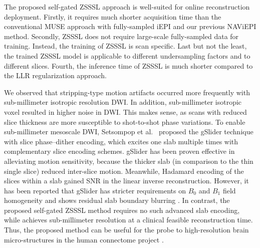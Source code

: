 \documentclass[journal,twoside,web]{ieeecolor}
\begin{document}

	The proposed self-gated ZSSSL approach is well-suited for online reconstruction deployment.
	Firstly, it requires much shorter acquisition time than
	the conventional MUSE approach with fully-sampled iEPI and
	our previous NAViEPI method.
	Secondly, ZSSSL does not require large-scale fully-sampled data for training.
	Instead, the training of ZSSSL is scan specific.
	Last but not the least,
	the trained ZSSSL model is applicable to different undersampling factors
	and to different slices.
	Fourth, the inference time of ZSSSL is much
	shorter compared to the LLR regularization approach.

	We observed that stripping-type motion artifacts occurred more frequently
	with sub-millimeter isotropic resolution DWI.
	In addition, sub-millimeter isotropic voxel resulted in higher noise in DWI.
	This makes sense, as scans with reduced slice thickness are more susceptible to
	shot-to-shot phase variations.
	To enable sub-millimeter mesoscale DWI,
	Setsompop et al.~\cite{setsompop_2018_gslider}
	proposed the gSlider technique with slice phase–dither encoding,
	which excites one slab multiple times with complementary slice encoding schemes.
	gSlider has been proven effective in alleviating motion sensitivity,
	because the thicker slab (in comparison to the thin single slice)
	reduced inter-slice motion.
	Meanwhile, Hadamard encoding of the slices within a slab gained SNR
	in the linear inverse reconstruction.
	However, it has been reported that gSlider has stricter requirements
	on $B_0$ and $B_1$ field homogeneity and shows residual slab boundary blurring
	\cite{dai_2021_smslab}.
	In contrast, the proposed self-gated ZSSSL method
	requires no such advanced slab encoding,
	while achieves sub-millimeter resolution
	at a clinical feasible reconstruction time.
	Thus, the proposed method can be useful for the probe to high-resolution
	brain micro-structures in the human connectome project \cite{huang_2021_hcp2}.
\end{document}
